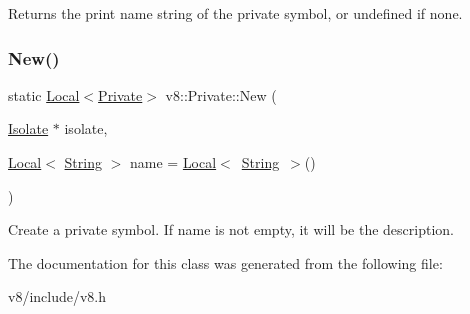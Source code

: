 Returns the print name string of the private symbol, or undefined if none. \mbox{\label{classv8_1_1Private_ae43aa9516121ed7a24cf5bba1654b653}} 
\subsubsection{\texorpdfstring{New()}{New()}}
{\footnotesize\ttfamily static \mbox{\hyperlink{classv8_1_1Local}{Local}}$<$\mbox{\hyperlink{classv8_1_1Private}{Private}}$>$ v8\+::\+Private\+::\+New (\begin{DoxyParamCaption}\item[{\mbox{\hyperlink{classv8_1_1Isolate}{Isolate}} $\ast$}]{isolate,  }\item[{\mbox{\hyperlink{classv8_1_1Local}{Local}}$<$ \mbox{\hyperlink{classv8_1_1String}{String}} $>$}]{name = {\ttfamily \mbox{\hyperlink{classv8_1_1Local}{Local}}$<$~\mbox{\hyperlink{classv8_1_1String}{String}}~$>$()} }\end{DoxyParamCaption})\hspace{0.3cm}{\ttfamily [static]}}

Create a private symbol. If name is not empty, it will be the description. 

The documentation for this class was generated from the following file\+:\begin{DoxyCompactItemize}
\item 
v8/include/v8.\+h\end{DoxyCompactItemize}
